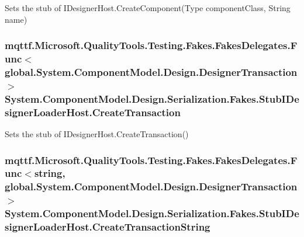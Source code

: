 Sets the stub of I\-Designer\-Host.\-Create\-Component(\-Type component\-Class, String name)

\hypertarget{class_system_1_1_component_model_1_1_design_1_1_serialization_1_1_fakes_1_1_stub_i_designer_loader_host_a5ae712b1cd75abaf68b99e85c2467030}{
\subsubsection[{Create\-Transaction}]{\setlength{\rightskip}{0pt plus 5cm}mqttf.\-Microsoft.\-Quality\-Tools.\-Testing.\-Fakes.\-Fakes\-Delegates.\-Func$<$global.\-System.\-Component\-Model.\-Design.\-Designer\-Transaction$>$ System.\-Component\-Model.\-Design.\-Serialization.\-Fakes.\-Stub\-I\-Designer\-Loader\-Host.\-Create\-Transaction}}\label{class_system_1_1_component_model_1_1_design_1_1_serialization_1_1_fakes_1_1_stub_i_designer_loader_host_a5ae712b1cd75abaf68b99e85c2467030}


Sets the stub of I\-Designer\-Host.\-Create\-Transaction()

\hypertarget{class_system_1_1_component_model_1_1_design_1_1_serialization_1_1_fakes_1_1_stub_i_designer_loader_host_ad4befea607f6994867060eb6448239e5}{
\subsubsection[{Create\-Transaction\-String}]{\setlength{\rightskip}{0pt plus 5cm}mqttf.\-Microsoft.\-Quality\-Tools.\-Testing.\-Fakes.\-Fakes\-Delegates.\-Func$<$string, global.\-System.\-Component\-Model.\-Design.\-Designer\-Transaction$>$ System.\-Component\-Model.\-Design.\-Serialization.\-Fakes.\-Stub\-I\-Designer\-Loader\-Host.\-Create\-Transaction\-String}}\label{class_system_1_1_component_model_1_1_design_1_1_serialization_1_1_fakes_1_1_stub_i_designer_loader_host_ad4befea607f6994867060eb6448239e5}


